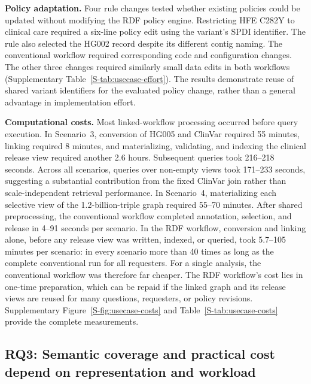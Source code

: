 \documentclass[pdflatex,sn-mathphys-num]{sn-jnl}
\begin{document}
\textbf{Policy adaptation.}
Four rule changes tested whether existing policies could be updated without modifying the RDF policy engine.
Restricting HFE C282Y to clinical care required a six-line policy edit using the variant's SPDI identifier.
The rule also selected the HG002 record despite its different contig naming.
The conventional workflow required corresponding code and configuration changes.
The other three changes required similarly small data edits in both workflows (Supplementary Table~\ref{S-tab:usecase-effort}).
The results demonstrate reuse of shared variant identifiers for the evaluated policy change, rather than a general advantage in implementation effort.

\textbf{Computational costs.}
Most linked-workflow processing occurred before query execution.
In Scenario~3, conversion of HG005 and ClinVar required 55 minutes, linking required 8 minutes, and materializing, validating, and indexing the clinical release view required another 2.6 hours.
Subsequent queries took 216--218 seconds.
Across all scenarios, queries over non-empty views took 171--233 seconds, suggesting a substantial contribution from the fixed ClinVar join rather than scale-independent retrieval performance.
In Scenario~4, materializing each selective view of the 1.2-billion-triple graph required 55--70 minutes.
After shared preprocessing, the conventional workflow completed annotation, selection, and release in 4--91 seconds per scenario.
In the RDF workflow, conversion and linking alone, before any release view was written, indexed, or queried, took 5.7--105 minutes per scenario: in every scenario more than 40 times as long as the complete conventional run for all requesters.
For a single analysis, the conventional workflow was therefore far cheaper.
The RDF workflow's cost lies in one-time preparation, which can be repaid if the linked graph and its release views are reused for many questions, requesters, or policy revisions.
Supplementary Figure~\ref{S-fig:usecase-costs} and Table~\ref{S-tab:usecase-costs} provide the complete measurements.


\subsection{RQ3: Semantic coverage and practical cost depend on representation and workload}\label{subsec:results-costs}
\end{document}
